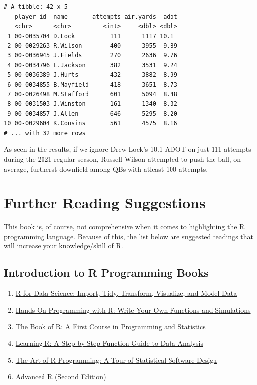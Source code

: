 \documentclass[
  letterpaper,
]{krantz}
\begin{document}
\begin{verbatim}
# A tibble: 42 x 5
   player_id  name       attempts air.yards  adot
   <chr>      <chr>         <int>     <dbl> <dbl>
 1 00-0035704 D.Lock          111      1117 10.1 
 2 00-0029263 R.Wilson        400      3955  9.89
 3 00-0036945 J.Fields        270      2636  9.76
 4 00-0034796 L.Jackson       382      3531  9.24
 5 00-0036389 J.Hurts         432      3882  8.99
 6 00-0034855 B.Mayfield      418      3651  8.73
 7 00-0026498 M.Stafford      601      5094  8.48
 8 00-0031503 J.Winston       161      1340  8.32
 9 00-0034857 J.Allen         646      5295  8.20
10 00-0029604 K.Cousins       561      4575  8.16
# ... with 32 more rows
\end{verbatim}

As seen in the results, if we ignore Drew Lock's 10.1 ADOT on just 111
attempts during the 2021 regular season, Russell Wilson attempted to
push the ball, on average, furtherst downfield among QBs with atleast
100 attempts.

\hypertarget{sec-appendix-reading}{%
\chapter{Further Reading Suggestions}\label{sec-appendix-reading}}

This book is, of course, not comprehensive when it comes to highlighting
the R programming language. Because of this, the list below are
suggested readings that will increase your knowledge/skill of R.

\hypertarget{introduction-to-r-programming-books}{%
\section{Introduction to R Programming
Books}\label{introduction-to-r-programming-books}}

\begin{enumerate}
\def\labelenumi{\arabic{enumi}.}
\item
  \href{https://amzn.to/3ovLXUB}{R for Data Science: Import, Tidy,
  Transform, Visualize, and Model Data}
\item
  \href{https://amzn.to/3PYUVWf}{Hands-On Programming with R: Write Your
  Own Functions and Simulations}
\item
  \href{https://amzn.to/3J8lWEv}{The Book of R: A First Course in
  Programming and Statistics}
\item
  \href{https://amzn.to/3zcjYhA}{Learning R: A Step-by-Step Function
  Guide to Data Analysis}
\item
  \href{https://amzn.to/3OBMjn2}{The Art of R Programming: A Tour of
  Statistical Software Design}
\item
  \href{https://amzn.to/3zbBT8f}{Advanced R (Second Edition)}
\end{enumerate}
\end{document}

